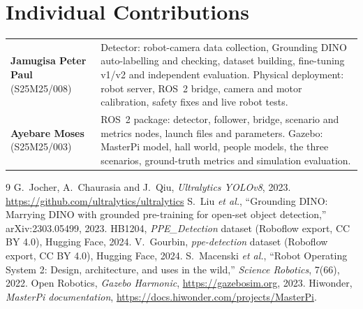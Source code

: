 \documentclass[10pt]{article}
\begin{document}
\section{Individual Contributions}
\begin{tabularx}{\linewidth}{>{\raggedright\arraybackslash}p{3.6cm} X}
\toprule
\textbf{Jamugisa Peter Paul} (S25M25/008) & Detector: robot-camera data collection, Grounding DINO auto-labelling and checking, dataset building, fine-tuning v1/v2 and independent evaluation. Physical deployment: robot server, ROS~2 bridge, camera and motor calibration, safety fixes and live robot tests. \\
\textbf{Ayebare Moses} (S25M25/003) & ROS~2 package: detector, follower, bridge, scenario and metrics nodes, launch files and parameters. Gazebo: MasterPi model, hall world, people models, the three scenarios, ground-truth metrics and simulation evaluation. \\
\bottomrule
\end{tabularx}

\small
\begin{thebibliography}{9}\setlength{\itemsep}{0pt}
 G.~Jocher, A.~Chaurasia and J.~Qiu, \emph{Ultralytics YOLOv8}, 2023. \url{https://github.com/ultralytics/ultralytics}
 S.~Liu \emph{et al.}, ``Grounding DINO: Marrying DINO with grounded pre-training for open-set object detection,'' arXiv:2303.05499, 2023.
 HB1204, \emph{PPE\_Detection} dataset (Roboflow export, CC BY 4.0), Hugging Face, 2024.
 V.~Gourbin, \emph{ppe-detection} dataset (Roboflow export, CC BY 4.0), Hugging Face, 2024.
 S.~Macenski \emph{et al.}, ``Robot Operating System 2: Design, architecture, and uses in the wild,'' \emph{Science Robotics}, 7(66), 2022.
 Open Robotics, \emph{Gazebo Harmonic}, \url{https://gazebosim.org}, 2023.
 Hiwonder, \emph{MasterPi documentation}, \url{https://docs.hiwonder.com/projects/MasterPi}.
\end{thebibliography}
\end{document}
